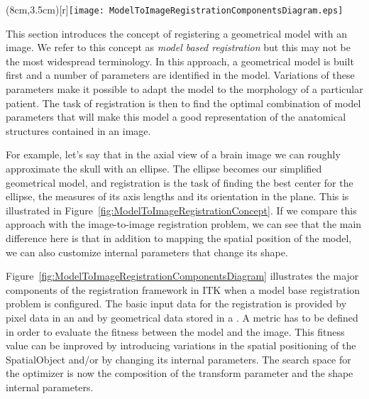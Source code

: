 %
%
%
%
%
%

\parpic(8cm,3.5cm)[r]{\texttt{[image: ModelToImageRegistrationComponentsDiagram.eps]}}

This section introduces the concept of registering a geometrical model with
an image. We refer to this concept as \emph{model based registration} but
this may not be the most widespread terminology. In this approach, a
geometrical model is built first and a number of parameters are identified in
the model. Variations of these parameters make it possible to adapt the model
to the morphology of a particular patient. The task of registration
is then to find the optimal combination of model parameters that will
make this model a good representation of the anatomical structures
contained in an image.

For example, let's say that in the axial view of a brain image we can roughly
approximate the skull with an ellipse. The ellipse becomes our simplified
geometrical model, and registration is the task of finding the best center for
the ellipse, the measures of its axis lengths and its orientation in the plane.
This is illustrated in Figure~\ref{fig:ModelToImageRegistrationConcept}.  If we
compare this approach with the image-to-image registration problem, we can see
that the main difference here is that in addition to mapping the spatial
position of the model, we can also customize internal parameters that change
its shape.

Figure~\ref{fig:ModelToImageRegistrationComponentsDiagram}   illustrates  the
major  components of  the registration  framework in  ITK when  a  model base
registration problem is configured. The basic input data for the registration
is  provided by  pixel data  in an   and  by  geometrical data
stored in a  . A metric has to be  defined in order to
evaluate the fitness between the model  and the image. This fitness value can
be  improved by  introducing variations  in  the spatial  positioning of  the
SpatialObject and/or  by changing its  internal parameters. The  search space
for the optimizer  is now the composition of the  transform parameter and the
shape internal parameters.

